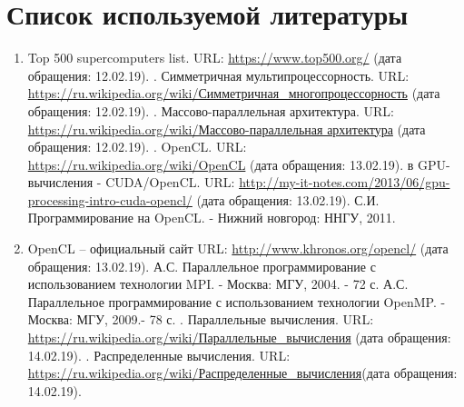 { %
	\section*{Список используемой литературы}
	\begin{enumerate}
		\sloppy
		 В.В., Балакшин П.В. Введение в параллельные вычисления. – СПб: Университет ИТМО, 2016. – 51 с.
		\item Top 500 supercomputers list. URL: \href{https://www.top500.org/} {https://www.top500.org/} (дата обращения: 12.02.19).
		. Симметричная мультипроцессорность. URL: \href{https://ru.wikipedia.org/wiki/%D0%A1%D0%B8%D0%BC%D0%BC%D0%B5%D1%82%D1%80%D0%B8%D1%87%D0%BD%D0%B0%D1%8F_%D0%BC%D0%BD%D0%BE%D0%B3%D0%BE%D0%BF%D1%80%D0%BE%D1%86%D0%B5%D1%81%D1%81%D0%BE%D1%80%D0%BD%D0%BE%D1%81%D1%82%D1%8C}{https://ru.wikipedia.org/wiki/Симметричная\_многопроцессорность} (дата обращения: 12.02.19).
		. Массово-параллельная архитектура. URL: \href{https://ru.wikipedia.org/wiki/%D0%9C%D0%B0%D1%81%D1%81%D0%BE%D0%B2%D0%BE-%D0%BF%D0%B0%D1%80%D0%B0%D0%BB%D0%BB%D0%B5%D0%BB%D1%8C%D0%BD%D0%B0%D1%8F_%D0%B0%D1%80%D1%85%D0%B8%D1%82%D0%B5%D0%BA%D1%82%D1%83%D1%80%D0%B0}{https://ru.wikipedia.org/wiki/Массово-параллельная архитектура} (дата обращения: 12.02.19).
		. OpenCL. URL: \href{https://ru.wikipedia.org/wiki/OpenCL}{https://ru.wikipedia.org/wiki/OpenCL} (дата обращения: 13.02.19).
		 в GPU-вычисления - CUDA/OpenCL. URL: \href{http://my-it-notes.com/2013/06/gpu-processing-intro-cuda-opencl/}{http://my-it-notes.com/2013/06/gpu-processing-intro-cuda-opencl/} (дата обращения: 13.02.19).
		 С.И. Программирование на OpenCL. - Нижний новгород: ННГУ, 2011.
		\item OpenCL – официальный сайт URL: \href{http://www.khronos.org/opencl/}{http://www.khronos.org/opencl/} (дата обращения: 13.02.19).
		 А.С. Параллельное программирование с использованием технологии MPI. - Москва: МГУ, 2004. - 72 с.
		 А.С. Параллельное программирование с использованием технологии OpenMP. - Москва: МГУ, 2009.- 78 с.
		. Параллельные вычисления. URL: \href{https://ru.wikipedia.org/wiki/%D0%9F%D0%B0%D1%80%D0%B0%D0%BB%D0%BB%D0%B5%D0%BB%D1%8C%D0%BD%D1%8B%D0%B5_%D0%B2%D1%8B%D1%87%D0%B8%D1%81%D0%BB%D0%B5%D0%BD%D0%B8%D1%8F} {https://ru.wikipedia.org/wiki/Параллельные\_вычисления} (дата обращения: 14.02.19).
		. Распределенные вычисления. URL: \href{https://ru.wikipedia.org/wiki/%D0%A0%D0%B0%D1%81%D0%BF%D1%80%D0%B5%D0%B4%D0%B5%D0%BB%D1%91%D0%BD%D0%BD%D1%8B%D0%B5_%D0%B2%D1%8B%D1%87%D0%B8%D1%81%D0%BB%D0%B5%D0%BD%D0%B8%D1%8F} {https://ru.wikipedia.org/wiki/Распределенные\_вычисления}(дата обращения: 14.02.19).

\end{enumerate}}
